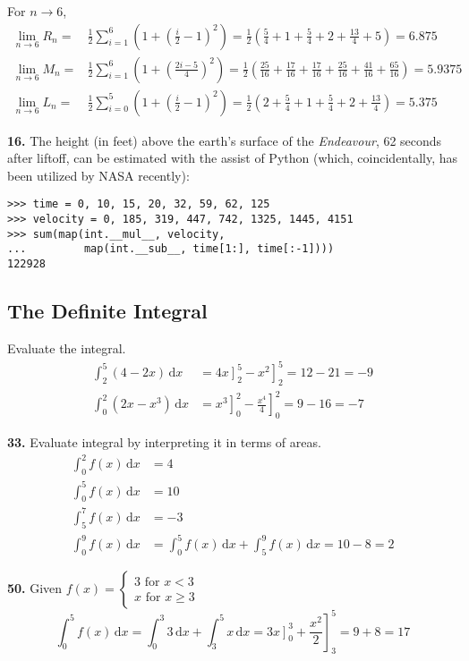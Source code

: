\documentclass[a4paper,12pt]{article}
\newcommand{\ud}{\,\mathrm{d}}
\begin{document}
For $n \to 6$,
\begin{align*}
  \lim_{n \to 6}R_n
=&\frac{1}{2}\sum_{i = 1}^6\left(1 + \left(\frac{i}{2} - 1\right)^2\right)
= \frac{1}{2}\left(\frac{5}{4} + 1 + \frac{5}{4} + 2 + \frac{13}{4} + 5\right)
= 6.875\\
  \lim_{n \to 6}M_n
=&\frac{1}{2}\sum_{i = 1}^6\left(1 + \left(\frac{2i - 5}{4}\right)^2\right)
= \frac{1}{2}\left(\frac{25}{16} + \frac{17}{16} + \frac{17}{16} +
                   \frac{25}{16} + \frac{41}{16} + \frac{65}{16}\right)
= 5.9375\\
  \lim_{n \to 6}L_n
=&\frac{1}{2}\sum_{i = 0}^5\left(1 + \left(\frac{i}{2} - 1\right)^2\right)
= \frac{1}{2}\left(2 + \frac{5}{4} + 1 + \frac{5}{4} + 2 + \frac{13}{4}\right)
= 5.375
\end{align*}

\noindent\textbf{16. }The height (in feet) above the earth's surface of the
\textit{Endeavour}, 62 seconds after liftoff, can be estimated with the assist
of Python (which, coincidentally, has been utilized by NASA recently):
\begin{verbatim}
>>> time = 0, 10, 15, 20, 32, 59, 62, 125
>>> velocity = 0, 185, 319, 447, 742, 1325, 1445, 4151
>>> sum(map(int.__mul__, velocity,
...         map(int.__sub__, time[1:], time[:-1])))
122928
\end{verbatim}

\subsection{The Definite Integral}
Evaluate the integral.
\begin{align*}
  \int_2^5(4 - 2x)\ud x &= \left.4x\right]_2^5 - \left.x^2\right]_2^5
= 12 - 21 = -9\tag{21}\\
  \int_0^2(2x - x^3)\ud x &= \left.x^3\right]_0^2 - \left.\frac{x^4}{4}\right]_0^2
= 9 - 16 = -7\tag{24}
\end{align*}

\noindent\textbf{33. }Evaluate integral by interpreting it in terms of areas.
\begin{align*}
  \int_0^2 f(x)\ud x &= 4\tag{a}\\
  \int_0^5 f(x)\ud x &= 10\tag{b}\\
  \int_5^7 f(x)\ud x &= -3\tag{c}\\
  \int_0^9 f(x)\ud x &= \int_0^5 f(x)\ud x + \int_5^9 f(x)\ud x
                      = 10 - 8 = 2\tag{d}
\end{align*}

\noindent\textbf{50. }Given $f(x) = \begin{cases}
                                      3\text{ for } x < 3\\
                                      x\text{ for } x \geq 3
                                    \end{cases}$
\[\int_0^5 f(x)\ud x = \int_0^3 3\ud x + \int_3^5 x\ud x
= \left.3x\right]_0^3 + \left.\frac{x^2}{2}\right]_3^5
= 9 + 8 = 17\]
\end{document}
